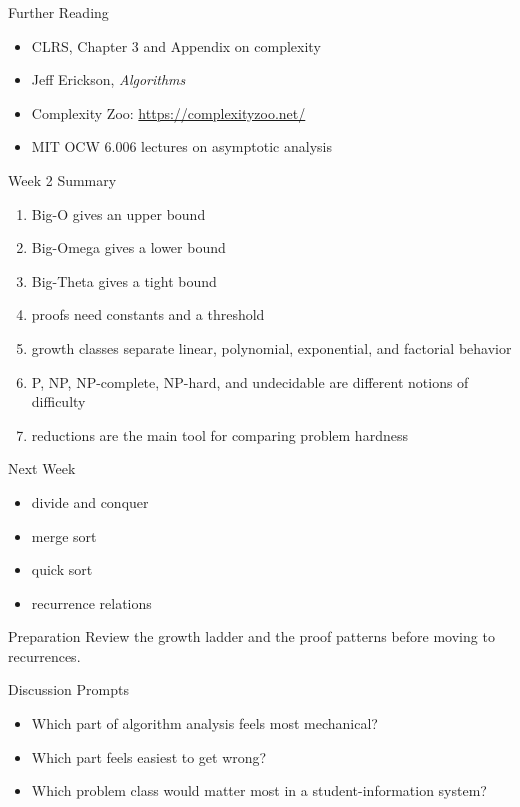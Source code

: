 \documentclass[aspectratio=169,xcolor=dvipsnames]{beamer}
\begin{document}
\begin{frame}{Further Reading}
  \begin{itemize}
    \item CLRS, Chapter 3 and Appendix on complexity
    \item Jeff Erickson, \emph{Algorithms}
    \item Complexity Zoo: \url{https://complexityzoo.net/}
    \item MIT OCW 6.006 lectures on asymptotic analysis
  \end{itemize}
\end{frame}

\begin{frame}{Week 2 Summary}
  \begin{enumerate}
    \item Big-O gives an upper bound
    \item Big-Omega gives a lower bound
    \item Big-Theta gives a tight bound
    \item proofs need constants and a threshold
    \item growth classes separate linear, polynomial, exponential, and factorial behavior
    \item P, NP, NP-complete, NP-hard, and undecidable are different notions of difficulty
    \item reductions are the main tool for comparing problem hardness
  \end{enumerate}
\end{frame}

\begin{frame}{Next Week}
  \begin{itemize}
    \item divide and conquer
    \item merge sort
    \item quick sort
    \item recurrence relations
  \end{itemize}
  \begin{block}{Preparation}
    Review the growth ladder and the proof patterns before moving to recurrences.
  \end{block}
\end{frame}

\begin{frame}{Discussion Prompts}
  \begin{itemize}
    \item Which part of algorithm analysis feels most mechanical?
    \item Which part feels easiest to get wrong?
    \item Which problem class would matter most in a student-information system?
  \end{itemize}
\end{frame}
\end{document}
